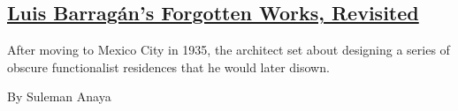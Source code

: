 \begin{enumerate}
\begin{enumerate}
    \hypertarget{luis-barraguxe1ns-forgotten-works-revisited}{%
    \subsection{\texorpdfstring{\href{/2020/07/24/t-magazine/luis-barragan.html}{Luis
    Barragán's Forgotten Works,
    Revisited}}{Luis Barragán's Forgotten Works, Revisited}}\label{luis-barraguxe1ns-forgotten-works-revisited}}

    After moving to Mexico City in 1935, the architect set about
    designing a series of obscure functionalist residences that he would
    later disown.

    By Suleman Anaya
  \end{enumerate}
\end{enumerate}

